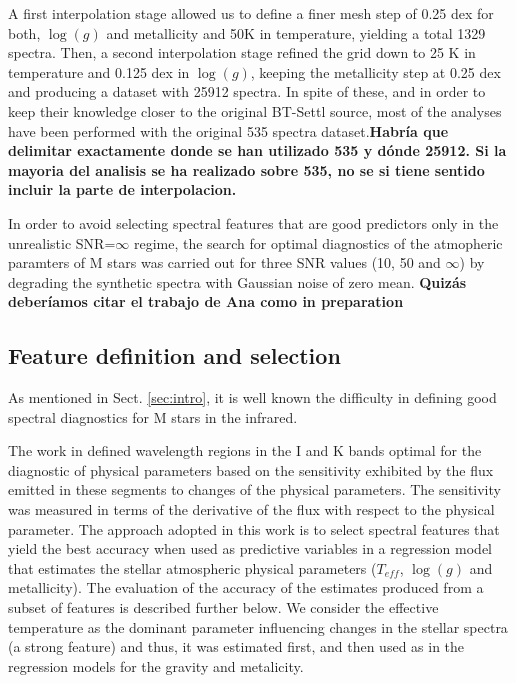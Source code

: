 

A first interpolation stage allowed us to define a finer mesh step of
0.25 dex for both, $\log(g)$ and metallicity and 50K in temperature,
yielding a total 1329 spectra.  Then, a second interpolation stage
refined the grid down to 25 K in temperature and 0.125 dex in
$\log(g)$, keeping the metallicity step at 0.25 dex and producing a
dataset with 25912 spectra.  In spite of these, and in order to keep
their knowledge closer to the original BT-Settl source, most of the
analyses have been performed with the original 535 spectra
dataset.{\bf Habría que delimitar exactamente donde se han utilizado
535 y dónde 25912. Si la mayoria del analisis se ha realizado sobre
535, no se si tiene sentido incluir la parte de interpolacion.}

In order to avoid selecting spectral features that are good predictors
only in the unrealistic SNR=$\infty$ regime, the search for optimal
diagnostics of the atmopheric paramters of M stars was carried out for
three SNR values (10, 50 and $\infty$) by degrading the synthetic
spectra with Gaussian noise of zero mean.  {\bf Quizás deberíamos
citar el trabajo de Ana como in preparation}

\subsection{Feature definition and selection}
\label{subsec:FD}
As mentioned in Sect. \ref{sec:intro}, it is well known the
difficulty in defining good spectral diagnostics for M stars in the
infrared.

The work in \cite{cesetti} defined wavelength regions in the I and K
bands optimal for the diagnostic of physical parameters based on the
sensitivity exhibited by the flux emitted in these segments to changes
of the physical parameters. The sensitivity was measured in terms of
the derivative of the flux with respect to the physical parameter. The
approach adopted in this work is to select spectral features that
yield the best accuracy when used as predictive variables in a
regression model that estimates the stellar atmospheric physical
parameters ($T_{eff}$, $\log(g)$ and metallicity). The evaluation of
the accuracy of the estimates produced from a subset of features is
described further below. We consider the effective temperature as the
dominant parameter influencing changes in the stellar spectra (a
strong feature) and thus, it was estimated first, and then used as in
the regression models for the gravity and metalicity.

